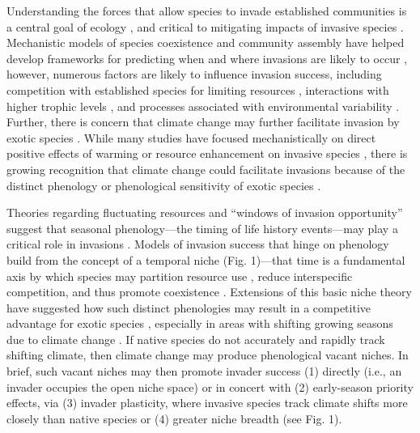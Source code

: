 \documentclass[11pt,a4paper,oneside]{article}
\begin{document}
\newpage
\linenumbers
{}

\noindent Understanding the forces that allow species to invade established communities is a central goal of ecology \citep{Elton:1958bk}, and critical to mitigating impacts of invasive species \citep{Levine:2003cn}. Mechanistic models of species coexistence and community assembly have helped develop frameworks for predicting when and where invasions are likely to occur \citep[e.g.,][]{Shea:2002pv}, however, numerous factors are likely to influence invasion success, including competition with established species for limiting resources \citep{Macarthur:1970kp,tilman1982,tilman1988}, interactions with higher trophic levels \citep{Keane:2002uz,Colautti2004}, and processes associated with environmental variability \citep{chesson1981,chesson1986}. Further, there is concern that climate change may further facilitate invasion by exotic species \citep{dukes2011}.  While many studies have focused mechanistically on direct positive effects of warming or resource enhancement on invasive species \citep{bradley2010}, there is growing recognition that climate change could facilitate invasions because of the distinct phenology or phenological sensitivity of exotic species \citep{Willis:2010al,wolkovichAmBot2013}.  

Theories regarding fluctuating resources \citep{Davis:2000tg} and ``windows of invasion opportunity'' \citep{drake2006,caplat2010} suggest that seasonal phenology---the timing of life history events---may play a critical role in invasions \citep{wolkovich:2010fee}. Models of invasion success that hinge on phenology build from the concept of a temporal niche (Fig. 1)---that time is a fundamental axis by which species may partition resource use \citep{gotelli1996}, reduce interspecific competition, and thus promote coexistence \citep{Chesson:1997dz}. Extensions of this basic niche theory have suggested how such distinct phenologies may result in a competitive advantage for exotic species \citep{Godoy:2009dz}, especially in areas with shifting growing seasons due to climate change \citep{wolkovich:2010fee}. If native species do not accurately and rapidly track shifting climate, then climate change may produce phenological vacant niches. In brief, such vacant niches may then promote invader success (1) directly (i.e., an invader occupies the open niche space) or in concert with (2) early-season priority effects, via (3) invader plasticity, where invasive species track climate shifts more closely than native species or (4) greater niche breadth (see Fig. 1). 
\end{document}
